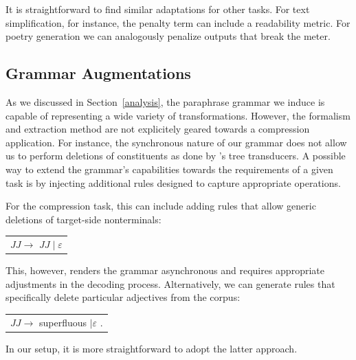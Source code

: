 \documentclass[11pt]{article}
\begin{document}
It is straightforward to find similar adaptations for other tasks. For
text simplification, for instance, the penalty term can include a
readability metric. For poetry generation we can analogously penalize
outputs that break the meter.


\subsection{Grammar Augmentations} \label{injection}

As we discussed in Section~\ref{analysis}, the paraphrase grammar we
induce is capable of representing a wide variety of
transformations. However, the formalism and extraction method are not
explicitely geared towards a compression application. For instance,
the synchronous nature of our grammar does not allow us to perform
deletions of constituents as done by 's tree
transducers.  A possible way to extend the grammar's capabilities
towards the requirements of a given task is by injecting additional
rules designed to capture appropriate operations.

For the compression task, this can include adding rules that allow
generic deletions of target-side nonterminals:
\begin{center}
\begin{tabular}{c}
 $\mathit{JJ} \rightarrow$ $\mathit{JJ} \mid \varepsilon$ \\
\end{tabular}
\end{center}
This, however, renders the grammar asynchronous and requires
appropriate adjustments in the decoding process. Alternatively, we can
generate rules that specifically delete particular adjectives from the
corpus:
\begin{center}
\begin{tabular}{c}
 $\mathit{JJ} \rightarrow$ superfluous $\mid \varepsilon$ .\\
\end{tabular}
\end{center}
In our setup, it is more straightforward to adopt the latter approach.

\end{document}
